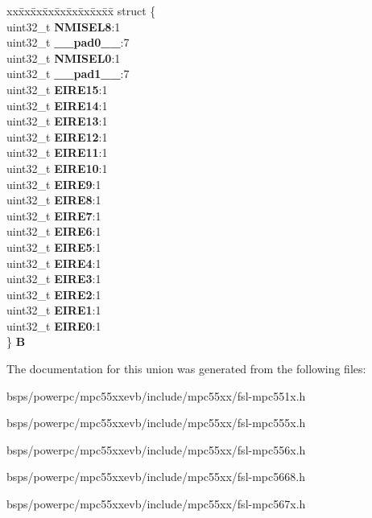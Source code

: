 \begin{DoxyCompactItemize}
\begin{tabbing}
\end{tabbing}\item 
\mbox{\label{unionSIU__tag_1_1SIU__DIRER__tag_a9ad21134bcc2b2e696d165d9dae41c86}} 
\begin{tabbing}
xx\=xx\=xx\=xx\=xx\=xx\=xx\=xx\=xx\=\kill
struct \{\\
\>uint32\_t {\bfseries NMISEL8}:1\\
\>uint32\_t {\bfseries \_\_pad0\_\_}:7\\
\>uint32\_t {\bfseries NMISEL0}:1\\
\>uint32\_t {\bfseries \_\_pad1\_\_}:7\\
\>uint32\_t {\bfseries EIRE15}:1\\
\>uint32\_t {\bfseries EIRE14}:1\\
\>uint32\_t {\bfseries EIRE13}:1\\
\>uint32\_t {\bfseries EIRE12}:1\\
\>uint32\_t {\bfseries EIRE11}:1\\
\>uint32\_t {\bfseries EIRE10}:1\\
\>uint32\_t {\bfseries EIRE9}:1\\
\>uint32\_t {\bfseries EIRE8}:1\\
\>uint32\_t {\bfseries EIRE7}:1\\
\>uint32\_t {\bfseries EIRE6}:1\\
\>uint32\_t {\bfseries EIRE5}:1\\
\>uint32\_t {\bfseries EIRE4}:1\\
\>uint32\_t {\bfseries EIRE3}:1\\
\>uint32\_t {\bfseries EIRE2}:1\\
\>uint32\_t {\bfseries EIRE1}:1\\
\>uint32\_t {\bfseries EIRE0}:1\\
\} {\bfseries B}\\

\end{tabbing}\end{DoxyCompactItemize}


The documentation for this union was generated from the following files\+:\begin{DoxyCompactItemize}
\item 
bsps/powerpc/mpc55xxevb/include/mpc55xx/fsl-\/mpc551x.\+h\item 
bsps/powerpc/mpc55xxevb/include/mpc55xx/fsl-\/mpc555x.\+h\item 
bsps/powerpc/mpc55xxevb/include/mpc55xx/fsl-\/mpc556x.\+h\item 
bsps/powerpc/mpc55xxevb/include/mpc55xx/fsl-\/mpc5668.\+h\item 
bsps/powerpc/mpc55xxevb/include/mpc55xx/fsl-\/mpc567x.\+h\end{DoxyCompactItemize}
